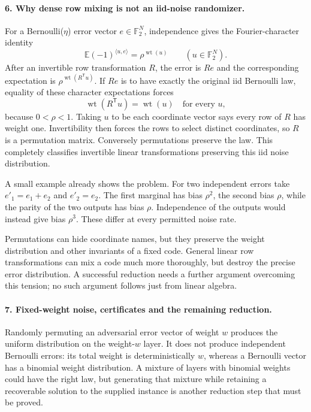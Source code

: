 \documentclass[11pt]{article}
\begin{document}
\paragraph{6. Why dense row mixing is not an iid-noise randomizer.}
For a Bernoulli($\eta$) error vector $e\in\mathbb F_2^N$, independence gives the Fourier-character identity
\[
 \mathbb E(-1)^{\langle u,e\rangle}=\rho^{\operatorname{wt}(u)}
 \qquad(u\in\mathbb F_2^N).
\]
After an invertible row transformation $R$, the error is $Re$ and the corresponding expectation is $\rho^{\operatorname{wt}(R^{\mathsf T}u)}$. If $Re$ is to have exactly the original iid Bernoulli law, equality of these character expectations forces
\[
 \operatorname{wt}(R^{\mathsf T}u)=\operatorname{wt}(u)
 \quad\text{for every }u,
\]
because $0<\rho<1$. Taking $u$ to be each coordinate vector says every row of $R$ has weight one. Invertibility then forces the rows to select distinct coordinates, so $R$ is a permutation matrix. Conversely permutations preserve the law. This completely classifies invertible linear transformations preserving this iid noise distribution.

A small example already shows the problem. For two independent errors take $e'_1=e_1+e_2$ and $e'_2=e_2$. The first marginal has bias $\rho^2$, the second bias $\rho$, while the parity of the two outputs has bias $\rho$. Independence of the outputs would instead give bias $\rho^3$. These differ at every permitted noise rate.

Permutations can hide coordinate names, but they preserve the weight distribution and other invariants of a fixed code. General linear row transformations can mix a code much more thoroughly, but destroy the precise error distribution. A successful reduction needs a further argument overcoming this tension; no such argument follows just from linear algebra.

\paragraph{7. Fixed-weight noise, certificates and the remaining reduction.}
Randomly permuting an adversarial error vector of weight $w$ produces the uniform distribution on the weight-$w$ layer. It does not produce independent Bernoulli errors: its total weight is deterministically $w$, whereas a Bernoulli vector has a binomial weight distribution. A mixture of layers with binomial weights could have the right law, but generating that mixture while retaining a recoverable solution to the supplied instance is another reduction step that must be proved.
\end{document}
